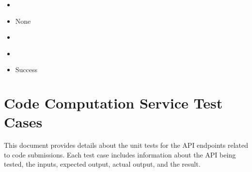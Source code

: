 \documentclass[letterpaper,10pt,english]{sphinxmanual}
\begin{document}
\subsection{}
\label{\detokenize{src/instructorTestCases:id28}}\begin{itemize}
\item {} 
\sphinxAtStartPar
{} 

\item {} 
\sphinxAtStartPar
{} None

\item {} 
\sphinxAtStartPar
{}

\begin{sphinxVerbatim}[commandchars=\\\{\}]
\end{sphinxVerbatim}

\item {} 
\sphinxAtStartPar
{}

\begin{sphinxVerbatim}[commandchars=\\\{\}]
\end{sphinxVerbatim}

\item {} 
\sphinxAtStartPar
{} Success

\end{itemize}

\sphinxstepscope


\chapter{Code Computation Service Test Cases}
\label{\detokenize{src/codeComputingTestCases:code-computation-service-test-cases}}\label{\detokenize{src/codeComputingTestCases::doc}}
\sphinxAtStartPar
This document provides details about the unit tests for the API endpoints related to code submissions. Each test case includes information about the API being tested, the inputs, expected output, actual output, and the result.
\end{document}
